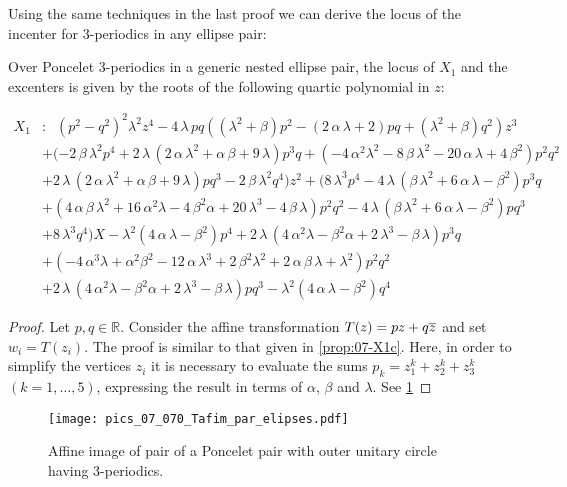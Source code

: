 Using the same techniques in the last proof we can derive the locus of the incenter for 3-periodics in any ellipse pair:

 \begin{proposition}
\label{prop:07-X1g}
Over Poncelet 3-periodics in a generic nested ellipse pair, the locus of $X_1$ and the excenters is given by the roots of the following quartic polynomial in $z$:

 {\small
\begin{align*}
X_1&: \;\; ( p^2-q^2 )^{2}  {\lambda}^{2}{z}^{4}-4
\,\lambda\,p q (  ( {\lambda}^{2}+\beta ) {p}^{2}-
 ( 2\,\alpha\,\lambda+2 ) p q+ ( {\lambda}^{2}+\beta
 ) {q}^{2} ) {z}^{3}\\
 &+ ( -2\,\beta\,{\lambda}^{2}{p}^{
4}+2\,\lambda\, ( 2\,\alpha\,{\lambda}^{2}+\alpha\,\beta+9\,
\lambda )  {p}^{3} q+ ( -4\,{\alpha}^{2}{\lambda}^{2}-8\,
\beta\,{\lambda}^{2}-20\,\alpha\,\lambda+4\,{\beta}^{2}) {p}^{2} {q}^{2
} \\
&+2\,\lambda\, ( 2\,\alpha\,{\lambda}^{2}+\alpha\,\beta+9
\,\lambda ) p {q}^{3}-2\,\beta\,{\lambda}^{2}{q}^{4} ) {z}^
{2} 
 + ( 8\,{\lambda}^{3}{p}^{4}-4\,\lambda\, ( \beta\,{
\lambda}^{2}+6\,\alpha\,\lambda-{\beta}^{2} ) {p}^{3} q\\
&+ ( 4
\,\alpha\,\beta\,{\lambda}^{2}+16\,{\alpha}^{2}\lambda-4\,{\beta}^{2}
\alpha+20\,{\lambda}^{3}-4\,\beta\,\lambda ) {p}^{2}{q}^{2}-4\,
\lambda\, ( \beta\,{\lambda}^{2}+6\,\alpha\,\lambda-{\beta}^{2}
 ) p {q}^{3}\\
 &+8\,{\lambda}^{3}{q}^{4} ) X-{\lambda}^{2}
 ( 4\,\alpha\,\lambda-{\beta}^{2} ) {p}^{4}+2\,\lambda\,
 ( 4\,{\alpha}^{2}\lambda-{\beta}^{2}\alpha+2\,{\lambda}^{3}-
\beta\,\lambda )  {p}^{3} q \\
&+ ( -4\,{\alpha}^{3}\lambda+{
\alpha}^{2}{\beta}^{2}-12\,\alpha\,{\lambda}^{3}+2\,{\beta}^{2}{
\lambda}^{2}+2\,\alpha\,\beta\,\lambda+{\lambda}^{2} ) {p
}^{2}{q}^{2}\\
&+2\,\lambda\, ( 4\,{\alpha}^{2}\lambda-{\beta}^{2}\alpha+2\,
{\lambda}^{3}-\beta\,\lambda ) p {q}^{3} -{\lambda}^{2} ( 4\,
\alpha\,\lambda-{\beta}^{2} ) {q}^{4}
\end{align*}
}

\end{proposition}

\begin{proof} Let $p,q\in \mathbb{R}$. Consider the affine transformation
$T(z)=pz+q\overline z$ and set $w_i=T(z_i)$. The proof is similar to that given in \cref{prop:07-X1c}.  Here, in order  to simplify the vertices $z_i$ it is necessary to evaluate the sums
$p_k=z_1^k+z_2^k+z_3^k$ $(k=1,\ldots, 5)$, expressing the result in terms of $\alpha$, $\beta$ and $\lambda$. See \cref{fig:07-tafim}
\end{proof}
\begin{figure}
    \centering
    \texttt{[image: pics\_07\_070\_Tafim\_par\_elipses.pdf]}
    \caption{Affine image of pair of a Poncelet pair with outer unitary circle having 3-periodics.  }
    \label{fig:07-tafim}
\end{figure}

